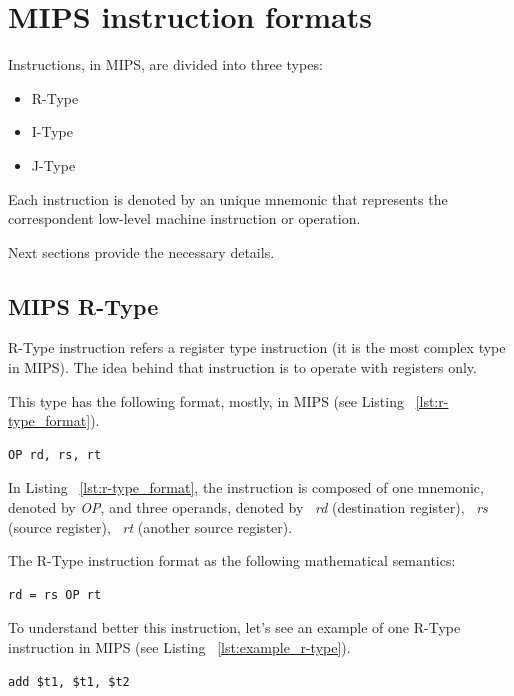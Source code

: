\documentclass[
  oneside,
  11pt, a4paper,
  footinclude=true,
  headinclude=true,
  cleardoublepage=empty
]{scrbook}
\begin{document}
\newpage



\section{MIPS instruction formats}
\label{sec:instruction_formats_mips}

Instructions, in MIPS, are divided into three types:
\begin{itemize}
\item R-Type
\item I-Type
\item J-Type
\end{itemize}

Each instruction is denoted by an unique mnemonic that represents the correspondent low-level machine instruction or operation.

Next sections provide the necessary details.

\subsection{MIPS R-Type}

R-Type instruction refers a register type instruction (it is the most complex type in MIPS).
The idea behind that instruction is to operate with registers only.

This type has the following format, mostly, in MIPS (see Listing ~\ref{lst:r-type_format}).

\begin{lstlisting}[caption={R-Type instruction format},label={lst:r-type_format}]
  OP rd, rs, rt
\end{lstlisting}

In Listing ~\ref{lst:r-type_format}, the instruction is composed of one mnemonic, denoted by \textit{OP}, and three operands, denoted by ~\textit{rd} (destination register), ~\textit{rs} (source register), ~\textit{rt} (another source register).

The R-Type instruction format as the following mathematical semantics:

\begin{lstlisting}[caption={},label={}]
  rd = rs OP rt
\end{lstlisting}

To understand better this instruction, let's see an example of one R-Type instruction in MIPS (see Listing ~\ref{lst:example_r-type}).

\begin{lstlisting}[caption={Example of a R-Type instruction},label={lst:example_r-type}]
  add $t1, $t1, $t2
\end{lstlisting}
\end{document}
